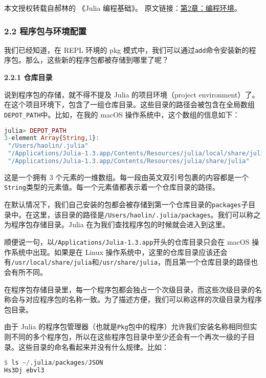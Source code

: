 
本文授权转载自郝林的 《Julia 编程基础》。 原文链接：\href{https://github.com/hyper0x/JuliaBasics/blob/master/book/ch02.md}{第2章：编程环境}。


\subsubsection{2.2 程序包与环境配置}

我们已经知道，在 REPL 环境的 pkg 模式中，我们可以通过\verb|add|命令安装新的程序包。那么，这些新的程序包都被存储到哪里了呢？

\textbf{2.2.1 仓库目录}

说到程序包的存储，就不得不提及 Julia 的项目环境（project environment）了。在这个项目环境下，包含了一组仓库目录。这些目录的路径会被包含在全局数组\verb|DEPOT_PATH|中。比如，在我的 macOS 操作系统中，这个数组的信息如下：

\begin{lstlisting}[language=julia]
julia> DEPOT_PATH
3-element Array{String,1}:
 "/Users/haolin/.julia"                                                  
 "/Applications/Julia-1.3.app/Contents/Resources/julia/local/share/julia"
 "/Applications/Julia-1.3.app/Contents/Resources/julia/share/julia" 
\end{lstlisting}

这是一个拥有 3 个元素的一维数组。每一段由英文双引号包裹的内容都是一个\verb|String|类型的元素值。每一个元素值都表示着一个仓库目录的路径。

在默认情况下，我们自己安装的包都会被存储到第一个仓库目录的\verb|packages|子目录中。在这里，该目录的路径是\verb|/Users/haolin/.julia/packages|。我们可以称之为程序包存储目录。Julia 在为我们查找程序包的时候就会进入到这里。

顺便说一句，以\verb|/Applications/Julia-1.3.app|开头的仓库目录只会在 macOS 操作系统中出现。如果是在 Linux 操作系统中，这里的仓库目录应该还会有\verb|/usr/local/share/julia|和\verb|/usr/share/julia|，而且第一个仓库目录的路径也会有所不同。

在程序包存储目录里，每一个程序包都会独占一个次级目录，而这些次级目录的名称会与对应程序包的名称一致。为了描述方便，我们可以称这样的次级目录为程序包目录。

由于 Julia 的程序包管理器（也就是\verb|Pkg|包中的程序）允许我们安装名称相同但实则不同的多个程序包，所以在这些程序包目录中至少还会有一个再次一级的子目录。这些目录的命名看起来并没有什么规律。比如：

\begin{lstlisting}[language=julia]
$ ls ~/.julia/packages/JSON
Hs3Dj ebvl3
\end{lstlisting}

